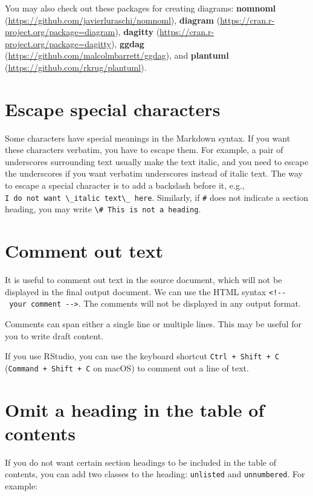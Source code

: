 \documentclass[
  11pt,
]{krantz}
\begin{document}
You may also check out these packages for creating diagrams: \textbf{nomnoml} (\url{https://github.com/javierluraschi/nomnoml}), \textbf{diagram} (\url{https://cran.r-project.org/package=diagram}), \textbf{dagitty} (\url{https://cran.r-project.org/package=dagitty}), \textbf{ggdag} (\url{https://github.com/malcolmbarrett/ggdag}), and \textbf{plantuml} (\url{https://github.com/rkrug/plantuml}).

\hypertarget{special-chars}{%
\section{Escape special characters}\label{special-chars}}

Some characters have special meanings in the Markdown syntax. If you want these characters verbatim, you have to escape them. For example, a pair of underscores surrounding text usually make the text italic, and you need to escape the underscores if you want verbatim underscores instead of italic text. The way to escape a special character is to add a backslash before it, e.g., \texttt{I\ do\ not\ want\ \textbackslash{}\_italic\ text\textbackslash{}\_\ here}. Similarly, if \texttt{\#} does not indicate a section heading, you may write \texttt{\textbackslash{}\#\ This\ is\ not\ a\ heading}.

\hypertarget{comments}{%
\section{Comment out text}\label{comments}}

It is useful to comment out text in the source document, which will not be displayed in the final output document. We can use the HTML syntax \texttt{\textless{}!-\/-\ your\ comment\ -\/-\textgreater{}}. The comments will not be displayed in any output format.

Comments can span either a single line or multiple lines. This may be useful for you to write draft content.

If you use RStudio, you can use the keyboard shortcut \texttt{Ctrl\ +\ Shift\ +\ C} (\texttt{Command\ +\ Shift\ +\ C} on macOS) to comment out a line of text.

\hypertarget{toc-unlisted}{%
\section{Omit a heading in the table of contents}\label{toc-unlisted}}

If you do not want certain section headings to be included in the table of contents, you can add two classes to the heading: \texttt{unlisted} and \texttt{unnumbered}. For example:
\end{document}
